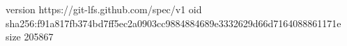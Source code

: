 version https://git-lfs.github.com/spec/v1
oid sha256:f91a817fb374bd7ff5ec2a0903cc9884884689e3332629d66d7164088861171e
size 205867
